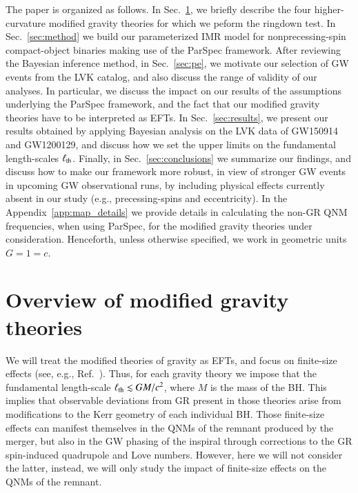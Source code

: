 \documentclass[twocolumn,
               prd,
               aps,
               superscriptaddress,
               tightenlines,
               nofootinbib,
               eqsecnum,
               amsfonts,
               amsmath,
               longbibliography]{revtex4-1}
\begin{document}
The paper is organized as follows. In Sec.~\ref{sec:review_theories}, we briefly describe the four
higher-curvature modified gravity theories for which we peform the ringdown test.
In Sec.~\ref{sec:method} we build our parameterized IMR model for nonprecessing-spin compact-object
binaries making use of the ParSpec framework. After reviewing the Bayesian inference method,
in Sec.~\ref{sec:pe}, we motivate our selection of GW events from the LVK catalog, and also
discuss the range of validity of our analyses. In particular, we discuss the impact on
our results of the assumptions underlying the ParSpec framework, and the fact that
our modified gravity theories have to be interpreted as EFTs. In Sec.~\ref{sec:results},
we present our results obtained by applying Bayesian analysis on the LVK data of
GW150914 and GW1200129, and discuss how we set the upper limits
on the fundamental length-scales $\ell_{\rm th}$. Finally, in Sec.~\ref{sec:conclusions} we
summarize our findings, and discuss how to make our framework more robust, in view
of stronger GW events in upcoming GW observational runs, by including  physical effects currently absent in our
study (e.g., precessing-spins and eccentricity). In the Appendix~\ref{app:map_details}
we provide details in calculating the non-GR QNM frequencies, when using ParSpec,
for the modified gravity theories under consideration.
%
Henceforth, unless otherwise specified, we work in geometric units $G = 1 = c$.

\section{Overview of modified gravity theories}
\label{sec:review_theories}


We will treat the modified theories of gravity as EFTs, and focus on
finite-size effects (see, e.g., Ref.~\cite{Sennett:2019bpc}). Thus, for each gravity theory we impose that
the fundamental length-scale $\ell_{\rm th} \lesssim GM/c^2$, where $M$ is the mass of the BH. This implies
that observable deviations from GR present in those theories arise from modifications
to the Kerr geometry of each individual BH. Those finite-size effects can manifest themselves in
the QNMs of the remnant produced by the merger, but also in the GW phasing of the inspiral through
corrections to the GR spin-induced quadrupole and Love numbers. However, here we will not consider the latter,
instead, we will only study the impact of finite-size effects on the QNMs of the
remnant.
\end{document}
